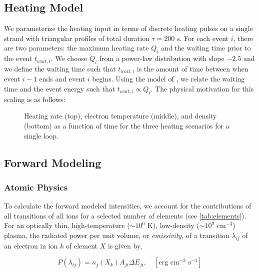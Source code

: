 \subsection{Heating Model}\label{heating}
We parameterize the heating input in terms of discrete heating pulses on a single strand with triangular profiles of total duration $\tau=200$ s. For each event $i$, there are two parameters: the maximum heating rate $Q_i$ and the waiting time prior to the event $t_{wait,i}$. We choose $Q_i$ from a power-law distribution with slope $-2.5$ and we define the waiting time such that $t_{wait,i}$ is the amount of time between when event $i-1$ ends and event $i$ begins. Using the model of \citet{cargill_active_2014}, we relate the waiting time and the event energy such that $t_{wait,i}\propto Q_i$. The physical motivation for this scaling is as follows: 


\begin{figure}
    \caption{Heating rate (top), electron temperature (middle), and density (bottom) as a function of time for the three heating scenarios for a single loop.}
    \label{fig:hydro}
\end{figure}


\subsection{Forward Modeling}\label{forward}

\subsubsection{Atomic Physics}\label{atomic}



To calculate the forward modeled intensities, we account for the contributions of all transitions of all ions for a selected number of elements (see \autoref{tab:elements}). For an optically thin, high-temperature ($\sim10^6$ K), low-density ($\sim10^9$ cm$^{-3}$) plasma, the radiated power per unit volume, or \textit{emissivity}, of a transition $\lambda_{ij}$ of an electron in ion $k$ of element $X$ is given by,

\begin{equation}
    \label{eq:ppuv}
    P(\lambda_{ij}) = n_j(X_k)A_{ji}\Delta E_{ji},\quad[\text{erg cm}^{-3}\text{ s}^{-1}]
\end{equation}

